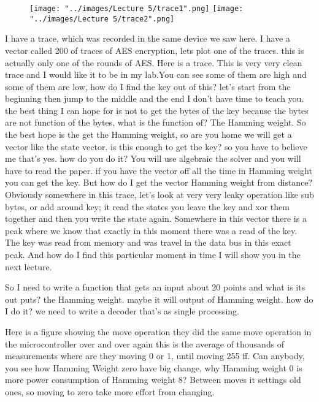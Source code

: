\documentclass{report}
\begin{document}
\begin{figure}[htp]
\centering
\texttt{[image: "../images/Lecture 5/trace1".png]}
\texttt{[image: "../images/Lecture 5/trace2".png]}
\caption{}
\label{}
\end{figure}

I have a trace, which was recorded in the same device we saw here. I have a vector called 200 of traces of AES encryption, lets plot one of the traces. this is actually only one of the rounds of AES. Here is a trace. This is very very clean trace and I would like it to be in my lab.You can see some of them are high and some of them are low, how do I find the key out of this? let's start from the beginning then jump to the middle and the end I don't have time to teach you. the best thing I can hope for is not to get the bytes of the key because the bytes are not function of the bytes, what is the function of? The Hamming weight. So the best hope is the get the Hamming weight, so are you home we will get a vector like the state vector. is this enough to get the key? so you have to believe me that's yes. how do you do it? You will use algebraic the solver and you will have to read the paper. if you have the vector off all the time in Hamming weight you can get the key. But how do I get the vector Hamming weight from distance? Obviously somewhere in this trace, let's look at very very leaky operation like sub bytes, or add around key; it read the states you leave the key and xor them together and then you write the state again. Somewhere in this vector there is a peak where we know that exactly in this moment there was a read of the key. The key was read from memory and was travel in the data bus in this exact peak. And how do I find this particular moment in time I will show you in the next lecture.

So I need to write a function that gets an input about 20 points and what is its out puts? the Hamming weight. maybe it will output of Hamming weight. how do I do it? we need to write a decoder that's as single processing.

Here is a figure showing the move operation they did the same move operation in the microcontroller over and over again this is the average of thousands of measurements where are they moving 0 or 1, until moving 255 ff. Can anybody, you see how Hamming Weight zero have big change, why Hamming weight 0 is more power consumption of Hamming weight 8? Between moves it settings old ones, so moving to zero take more effort from changing.
 
\end{document}
